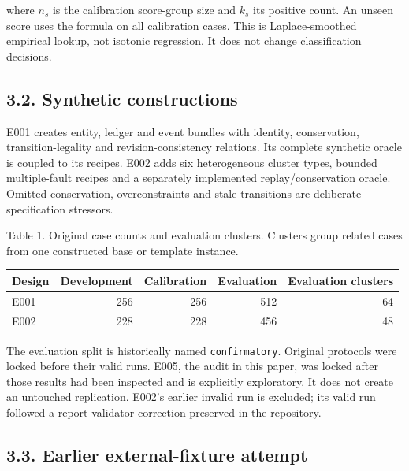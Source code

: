where \(n_s\) is the calibration score-group size and \(k_s\) its
positive count. An unseen score uses the formula on all calibration
cases. This is Laplace-smoothed empirical lookup, not isotonic
regression. It does not change classification decisions.

\hypertarget{synthetic-constructions}{%
\subsection{3.2. Synthetic
constructions}\label{synthetic-constructions}}

E001 creates entity, ledger and event bundles with identity,
conservation, transition-legality and revision-consistency relations.
Its complete synthetic oracle is coupled to its recipes. E002 adds six
heterogeneous cluster types, bounded multiple-fault recipes and a
separately implemented replay/conservation oracle. Omitted conservation,
overconstraints and stale transitions are deliberate specification
stressors.

\noindent\begin{minipage}{\linewidth}
\noindent Table 1. Original case counts and evaluation clusters. Clusters group
related cases from one constructed base or template instance.
\par\medskip\centering
\begin{tabular}{@{}lrrrr@{}}
\toprule
Design & Development & Calibration & Evaluation & Evaluation clusters \\
\midrule

E001 & 256 & 256 & 512 & 64 \\
E002 & 228 & 228 & 456 & 48 \\
\bottomrule
\end{tabular}
\end{minipage}


The evaluation split is historically named \texttt{confirmatory}.
Original protocols were locked before their valid runs. E005, the audit
in this paper, was locked after those results had been inspected and is
explicitly exploratory. It does not create an untouched replication.
E002's earlier invalid run is excluded; its valid run followed a
report-validator correction preserved in the repository.

\hypertarget{earlier-external-fixture-attempt}{%
\subsection{3.3. Earlier external-fixture
attempt}\label{earlier-external-fixture-attempt}}

